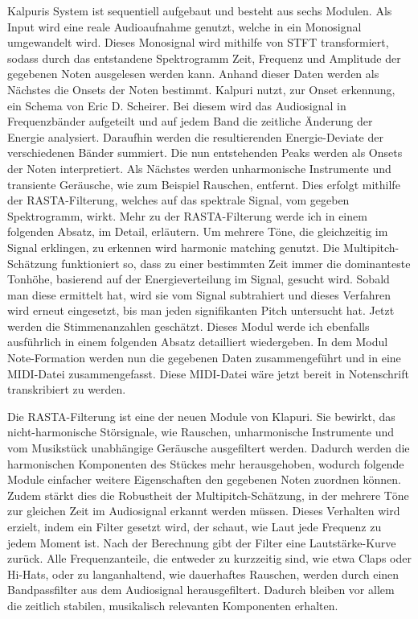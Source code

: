 Kalpuris System ist sequentiell aufgebaut und besteht aus sechs Modulen.
Als Input wird eine reale Audioaufnahme genutzt, welche in ein Monosignal umgewandelt wird.
Dieses Monosignal wird mithilfe von STFT transformiert, sodass durch das entstandene Spektrogramm Zeit,
Frequenz und Amplitude der gegebenen Noten ausgelesen werden kann.
Anhand dieser Daten werden als Nächstes die Onsets der Noten bestimmt.
Kalpuri nutzt, zur Onset erkennung, ein Schema von Eric D. Scheirer.
\cite{scheirer1998tempo}
Bei diesem wird das Audiosignal in Frequenzbänder aufgeteilt und
auf jedem Band die zeitliche Änderung der Energie analysiert.
Daraufhin werden die resultierenden Energie-Deviate der verschiedenen Bänder summiert.
Die nun entstehenden Peaks werden als Onsets der Noten interpretiert.
Als Nächstes werden unharmonische Instrumente und transiente Geräusche, wie zum Beispiel Rauschen, entfernt.
Dies erfolgt mithilfe der RASTA-Filterung, welches auf das spektrale Signal, vom gegeben Spektrogramm, wirkt.
Mehr zu der RASTA-Filterung werde ich in einem folgenden Absatz, im Detail, erläutern.
Um mehrere Töne, die gleichzeitig im Signal erklingen, zu erkennen wird harmonic matching genutzt.
Die Multipitch-Schätzung funktioniert so, dass zu einer bestimmten Zeit immer die dominanteste Tonhöhe,
basierend auf der Energieverteilung im Signal, gesucht wird.
Sobald man diese ermittelt hat, wird sie vom Signal subtrahiert und dieses Verfahren wird erneut eingesetzt,
bis man jeden signifikanten Pitch untersucht hat.
Jetzt werden die Stimmenanzahlen geschätzt.
Dieses Modul werde ich ebenfalls ausführlich in einem folgenden Absatz detailliert wiedergeben.
In dem Modul Note-Formation werden nun die gegebenen Daten zusammengeführt und in eine MIDI-Datei zusammengefasst.
Diese MIDI-Datei wäre jetzt bereit in Notenschrift transkribiert zu werden.

Die RASTA-Filterung ist eine der neuen Module von Klapuri.
Sie bewirkt, das nicht-harmonische Störsignale, wie
Rauschen, unharmonische Instrumente und vom Musikstück unabhängige Geräusche ausgefiltert werden.
Dadurch werden die harmonischen Komponenten des Stückes mehr herausgehoben,
wodurch folgende Module einfacher weitere Eigenschaften den gegebenen Noten zuordnen können.
Zudem stärkt dies die Robustheit der Multipitch-Schätzung,
in der mehrere Töne zur gleichen Zeit im Audiosignal erkannt werden müssen.
Dieses Verhalten wird erzielt, indem ein Filter gesetzt wird,
der schaut, wie Laut jede Frequenz zu jedem Moment ist.
Nach der Berechnung gibt der Filter eine Lautstärke-Kurve zurück.
Alle Frequenzanteile, die entweder zu kurzzeitig sind, wie etwa Claps oder Hi-Hats, oder zu langanhaltend,
wie dauerhaftes Rauschen, werden durch einen Bandpassfilter aus dem Audiosignal herausgefiltert.
Dadurch bleiben vor allem die zeitlich stabilen, musikalisch relevanten Komponenten erhalten.

